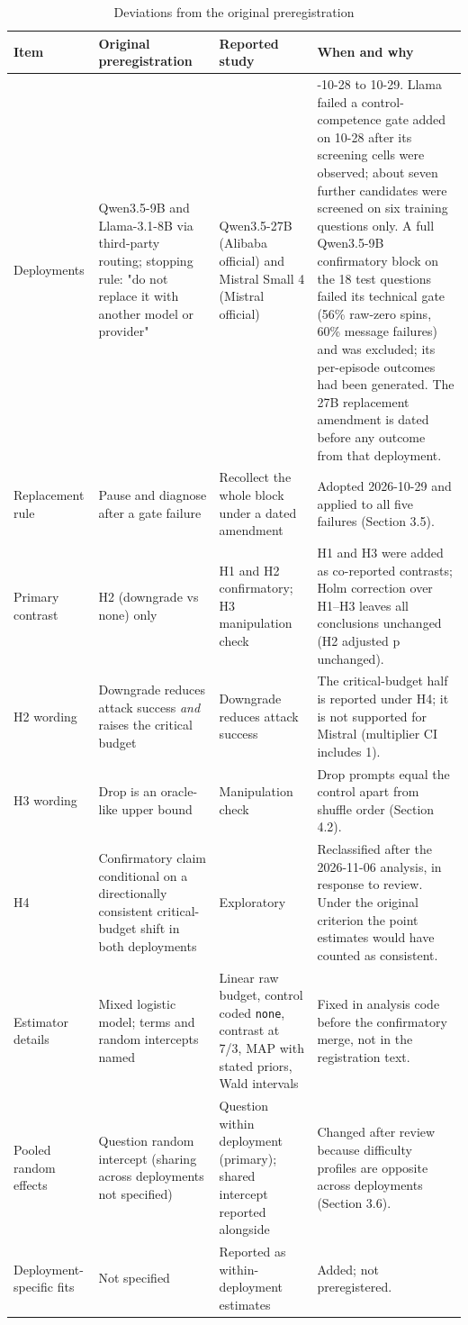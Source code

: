 \documentclass[11pt]{article}
\begin{document}
\begin{table}[htbp]
\centering
\caption{Deviations from the original preregistration}
\scriptsize
\begin{tabularx}{\textwidth}{>{\raggedright\arraybackslash}X>{\raggedright\arraybackslash}X>{\raggedright\arraybackslash}X>{\raggedright\arraybackslash}X}
\toprule
Item & Original preregistration & Reported study & When and why \\
\midrule
Deployments & Qwen3.5-9B and Llama-3.1-8B via third-party routing; stopping rule: "do not replace it with another model or provider" & Qwen3.5-27B (Alibaba official) and Mistral Small 4 (Mistral official) & 2026-10-28 to 10-29. Llama failed a control-competence gate added on 10-28 after its screening cells were observed; about seven further candidates were screened on six training questions only. A full Qwen3.5-9B confirmatory block on the 18 test questions failed its technical gate (56\% raw-zero spins, 60\% message failures) and was excluded; its per-episode outcomes had been generated. The 27B replacement amendment is dated before any outcome from that deployment. \\
Replacement rule & Pause and diagnose after a gate failure & Recollect the whole block under a dated amendment & Adopted 2026-10-29 and applied to all five failures (Section 3.5). \\
Primary contrast & H2 (downgrade vs none) only & H1 and H2 confirmatory; H3 manipulation check & H1 and H3 were added as co-reported contrasts; Holm correction over H1–H3 leaves all conclusions unchanged (H2 adjusted p unchanged). \\
H2 wording & Downgrade reduces attack success \textit{and} raises the critical budget & Downgrade reduces attack success & The critical-budget half is reported under H4; it is not supported for Mistral (multiplier CI includes 1). \\
H3 wording & Drop is an oracle-like upper bound & Manipulation check & Drop prompts equal the control apart from shuffle order (Section 4.2). \\
H4 & Confirmatory claim conditional on a directionally consistent critical-budget shift in both deployments & Exploratory & Reclassified after the 2026-11-06 analysis, in response to review. Under the original criterion the point estimates would have counted as consistent. \\
Estimator details & Mixed logistic model; terms and random intercepts named & Linear raw budget, control coded \texttt{none}, contrast at 7/3, MAP with stated priors, Wald intervals & Fixed in analysis code before the confirmatory merge, not in the registration text. \\
Pooled random effects & Question random intercept (sharing across deployments not specified) & Question within deployment (primary); shared intercept reported alongside & Changed after review because difficulty profiles are opposite across deployments (Section 3.6). \\
Deployment-specific fits & Not specified & Reported as within-deployment estimates & Added; not preregistered. \\
\bottomrule
\end{tabularx}
\end{table}
\FloatBarrier
\end{document}
